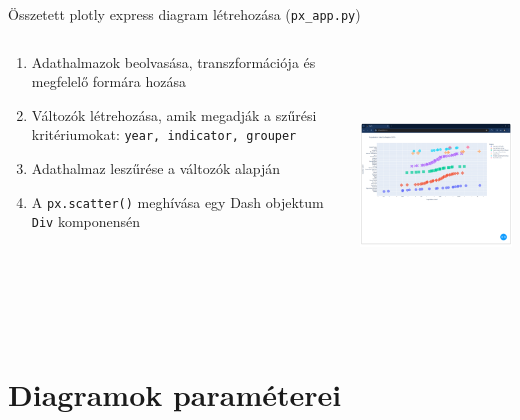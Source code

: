 \documentclass[english, aspectratio=169]{beamer}
\makeatletter
\let\origtableofcontents=\tableofcontents
\def\tableofcontents{\@ifnextchar[{\origtableofcontents}{\gobbletableofcontents}}
\def\gobbletableofcontents#1{\origtableofcontents}
\makeatother
\begin{document}
\begin{frame}{Összetett plotly express diagram létrehozása (\texttt{px\_app.py})}
	\begin{columns}
		\begin{column}{.5\textwidth}
			\begin{enumerate}
				\item Adathalmazok beolvasása, transzformációja és megfelelő formára hozása
				\item Változók létrehozása, amik megadják a szűrési kritériumokat: \texttt{year, indicator, grouper}
				\item Adathalmaz leszűrése a változók alapján
				\item A \texttt{px.scatter()} meghívása egy Dash objektum \texttt{Div} komponensén
			\end{enumerate}
		\end{column}
		\begin{column}{.5\textwidth}
			\begin{center}
				\includegraphics[width=7cm, height=7cm, keepaspectratio]{images/plots_13.png}
			\end{center}
		\end{column} 
	\end{columns}
\end{frame}

\section{Diagramok paraméterei}

\begin{frame}{}
	\tableofcontents[currentsection]
\end{frame}
\end{document}
